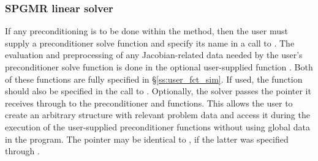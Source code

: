 \subsubsection{SPGMR linear solver}\label{sss:optin_spgmr}
If any preconditioning is to be done within the {\spgmr} method,
then the user must supply a preconditioner solve function 
and specify its name in a call to .
The evaluation and preprocessing of any Jacobian-related data needed
by the user's preconditioner solve function is done in the optional
user-supplied function . Both of these functions are
fully specified in \S\ref{ss:user_fct_sim}.
If used, the  function should also be specified in the call to
.
Optionally, the {\cvspgmr} solver passes the pointer  it
receives through  to the preconditioner
 and  functions.  This allows the user to create
an arbitrary structure with relevant problem data and access it during
the execution of the user-supplied preconditioner functions without using
global data in the program.  The pointer  may be identical
to , if the latter was specified through .

